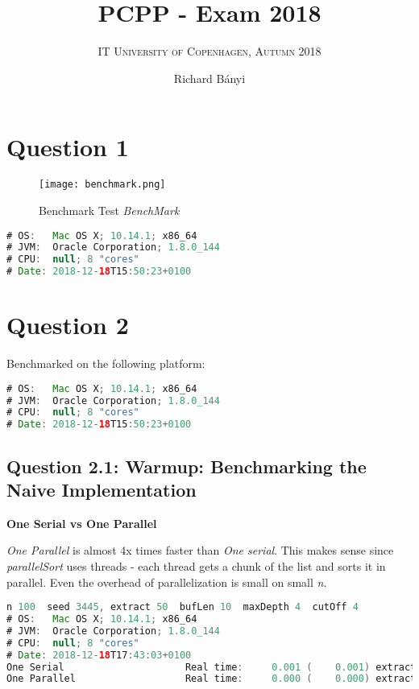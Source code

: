 \documentclass[format=acmsmall, review=false, screen=true]{acmart}
\author{Richard Bányi}
\title{\textsc{PCPP} - Exam 2018}
\subtitle{\textsc{IT University of Copenhagen, Autumn 2018}}
\begin{document}
\maketitle

\section{Question 1}

\begin{figure}[H]
  \texttt{[image: benchmark.png]}
  \caption{Benchmark Test \textit{BenchMark}}
  \label{fig:benchmark}
\end{figure}


\begin{lstlisting}[language=java]
# OS:   Mac OS X; 10.14.1; x86_64
# JVM:  Oracle Corporation; 1.8.0_144
# CPU:  null; 8 "cores"
# Date: 2018-12-18T15:50:23+0100
\end{lstlisting}


\section{Question 2}

Benchmarked on the following platform:

\begin{lstlisting}[language=java]
# OS:   Mac OS X; 10.14.1; x86_64
# JVM:  Oracle Corporation; 1.8.0_144
# CPU:  null; 8 "cores"
# Date: 2018-12-18T15:50:23+0100
\end{lstlisting}

\subsection{Question 2.1: Warmup: Benchmarking the Naive Implementation}


\textbf{One Serial vs One Parallel}

\emph{One Parallel} is almost 4x times faster than \emph{One serial}. This makes sense since \emph{parallelSort} uses threads - each thread gets a chunk of the list and sorts it in parallel. Even the overhead of parallelization is small on small \emph{n}.

\begin{lstlisting}[language=java]
n 100  seed 3445, extract 50  bufLen 10  maxDepth 4  cutOff 4
# OS:   Mac OS X; 10.14.1; x86_64
# JVM:  Oracle Corporation; 1.8.0_144
# CPU:  null; 8 "cores"
# Date: 2018-12-18T17:43:03+0100
One Serial                     Real time:     0.001 (    0.001) extract:    50
One Parallel                   Real time:     0.000 (    0.000) extract:    50
\end{lstlisting}
\end{document}
